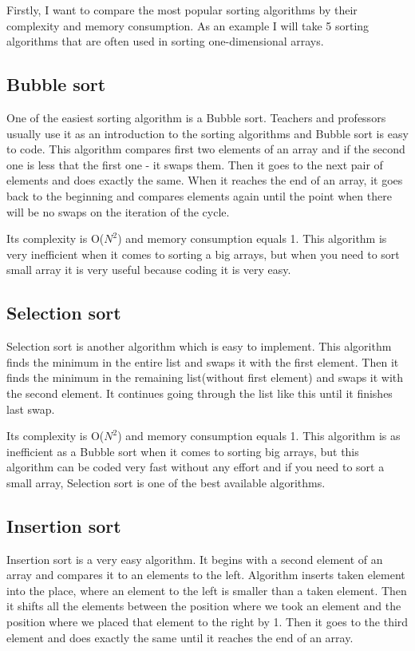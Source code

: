 \documentclass[12pt,twoside,a4paper]{article}
\begin{document}
Firstly, I want to compare the most popular sorting algorithms by their complexity and memory consumption. As an example I will take 5 sorting algorithms that are often used in sorting one-dimensional arrays.

\subsection{Bubble sort}
One of the easiest sorting algorithm is a Bubble sort. Teachers and professors usually use it as an introduction to the sorting algorithms and Bubble sort is easy to code. This algorithm compares first two elements of an array and if the second one is less that the first one - it swaps them. Then it goes to the next pair of elements and does exactly the same. When it reaches the end of an array, it goes back to the beginning and compares elements again until the point when there will be no swaps on the iteration of the cycle. 

Its complexity is O($N^{2}$) and memory consumption equals 1. This algorithm is very inefficient when it comes to sorting a big arrays, but when you need to sort small array it is very useful because coding it is very easy. 

\subsection{Selection sort}
Selection sort is another algorithm which is easy to implement. This algorithm finds the minimum in the entire list and swaps it with the first element. Then it finds the minimum in the remaining list(without first element) and swaps it with the second element. It continues going through the list like this until it finishes last swap. 

Its complexity is O($N^{2}$) and memory consumption equals 1. This algorithm is as inefficient as a Bubble sort when it comes to sorting big arrays, but this algorithm can be coded very fast without any effort and if you need to sort a small array, Selection sort is one of the best available algorithms. 

\subsection{Insertion sort}

Insertion sort is a very easy algorithm. It begins with a second element of an array and compares it to an elements to the left. Algorithm inserts taken element into the place, where an element to the left is smaller than a taken element. Then it shifts all the elements between the position where we took an element and the position where we placed that element to the right by 1. Then it goes to the third element and does exactly the same until it reaches the end of an array. 
\end{document}
